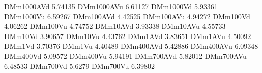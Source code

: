 DMm1000AVd 5.74135
DMm1000AVu 6.61127
DMm1000Vd 5.93361
DMm1000Vu 6.59267
DMm100AVd 4.42525
DMm100AVu 4.94272
DMm100Vd 4.06262
DMm100Vu 4.74752
DMm10AVd 3.93338
DMm10AVu 4.55733
DMm10Vd 3.90657
DMm10Vu 4.43762
DMm1AVd 3.83651
DMm1AVu 4.50092
DMm1Vd 3.70376
DMm1Vu 4.40489
DMm400AVd 5.42886
DMm400AVu 6.09348
DMm400Vd 5.09572
DMm400Vu 5.94191
DMm700AVd 5.82012
DMm700AVu 6.48533
DMm700Vd 5.6279
DMm700Vu 6.39802
